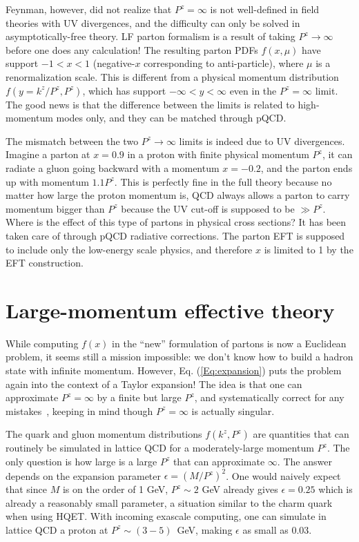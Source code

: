 \documentclass[prd,aps,twocolumn,preprintnumbers,showpacs,nofootinbib,superscriptaddress,notitlepage]{revtex4-1}
\begin{document}
Feynman, however, did not realize that $P^z=\infty$
is not well-defined in field theories with UV divergences,
and the difficulty can only be solved in asymptotically-free theory.
LF parton formalism is a result of taking $P^z\to \infty $
before one does any calculation! The resulting
parton PDFs $f(x,\mu)$ have support $-1<x<1$ (negative-$x$
corresponding to anti-particle), where $\mu$
is a renormalization scale. This is different from
a physical momentum distribution $f(y=k^z/P^z,P^z)$, which
has support $-\infty<y<\infty$ even in the $P^z=\infty$ limit.
The good news is that the difference between the limits is related to
high-momentum modes only, and they can be matched through pQCD.

The mismatch between the two $P^z\to\infty$ limits is indeed due
to UV divergences. Imagine a parton at $x=0.9$ in a proton with finite physical
momentum $P^z$, it can radiate
a gluon going backward with a momentum $x=-0.2$, and the parton ends up
with momentum $1.1P^z$. This is perfectly fine in the full theory
because no matter how large the proton momentum is, QCD always
allows a parton to carry momentum bigger than $P^z$ because the UV
cut-off is supposed to be $\gg P^z$. Where is the effect of this type
of partons in physical cross sections? It has been
taken care of through pQCD radiative
corrections. The parton EFT is supposed to include
only the low-energy scale physics, and therefore $x$ is limited
to 1 by the EFT construction.

\section{Large-momentum effective theory}

While computing $f(x)$ in the ``new'' formulation of
partons is now a Euclidean problem, it seems
still a mission impossible: we don't know how to build a
hadron state with infinite momentum. However,
Eq. (\ref{Eq:expansion}) puts the problem
again into the context of a Taylor expansion!
The idea is that one can approximate $P^z=\infty$ by a finite but
large $P^z$, and systematically correct for
any mistakes~\cite{Ji:2013dva}, keeping in mind though $P^z=\infty$
is actually singular.

The quark and gluon momentum distributions
$f(k^z,P^z)$ are quantities that can routinely be simulated
in lattice QCD for a moderately-large momentum $P^z$.
The only question is how large is a large $P^z$
that can approximate $\infty$. The answer depends
on the expansion parameter $\epsilon=(M/P^z)^2$.
One would naively expect that since $M$ is on the order of 1 GeV,
$P^z\sim 2$ GeV already gives $\epsilon=0.25$ which is already
a reasonably small parameter, a situation similar
to the charm quark when using HQET. With incoming exascale
computing, one can simulate in lattice
QCD a proton at $P^z\sim (3-5)$~GeV, making $\epsilon$
as small as $0.03$.
\end{document}
